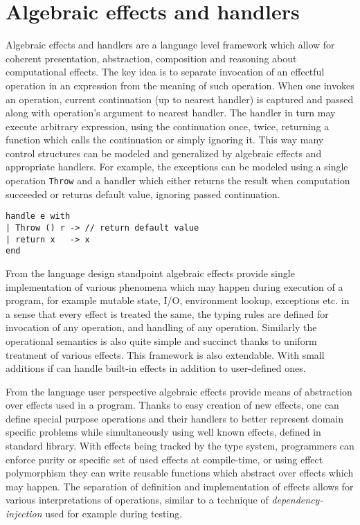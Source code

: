 \documentclass[inz, english, shortabstract]{iithesis}
\begin{document}
\section{Algebraic effects and handlers}
Algebraic effects and handlers are a language level framework which allow for coherent presentation, abstraction, composition and reasoning about computational effects.
The key idea is to separate invocation of an effectful operation in an expression from the meaning of such operation.
When one invokes an operation, current continuation (up to nearest handler) is captured and passed along with operation's argument to nearest handler.
The handler in turn may execute arbitrary expression, using the continuation once, twice, returning a function which calls the continuation or simply ignoring it.
This way many control structures can be modeled and generalized by algebraic effects and appropriate handlers.
For example, the exceptions can be modeled using a single operation \texttt{Throw} and a handler which either returns the result when computation succeeded or returns default value, ignoring passed continuation.
\begin{verbatim}
handle e with
| Throw () r -> // return default value
| return x   -> x
end
\end{verbatim}
From the language design standpoint algebraic effects provide single implementation of various phenomena which may happen during execution of a program, for example mutable state, I/O, environment lookup, exceptions etc. in a sense that every effect is treated the same, the typing rules are defined for invocation of any operation, and handling of any operation.
Similarly the operational semantics is also quite simple and succinct thanks to uniform treatment of various effects.
This framework is also extendable. With small additions if can handle built-in effects in addition to user-defined ones.

From the language user perspective algebraic effects provide means of abstraction over effects used in a program.
Thanks to easy creation of new effects, one can define special purpose operations and their handlers to better represent domain specific problems while simultaneously using well known effects, defined in standard library.
With effects being tracked by the type system, programmers can enforce purity or specific set of used effects at compile-time, or using effect polymorphism they can write reusable functions which abstract over effects which may happen.
The separation of definition and implementation of effects allows for various interpretations of operations, similar to a technique of \emph{dependency-injection} used for example during testing.
\end{document}
